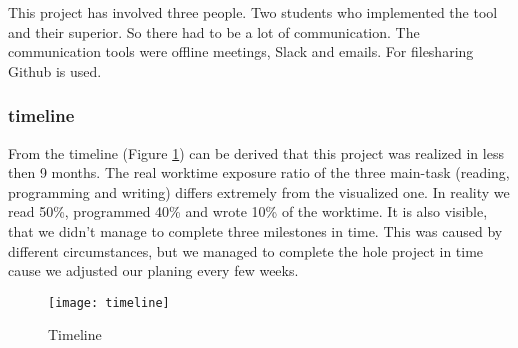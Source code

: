This project has involved three people. Two students who implemented the tool and their superior. So there had to be a lot of communication. The communication tools were offline meetings, Slack and emails. For filesharing Github is used. 


\subsubsection*{timeline}
From the timeline (Figure \ref{fig:timeline}) can be derived that this project was realized in less then 9 months. The real worktime exposure ratio of the three main-task (reading, programming and writing) differs extremely from the visualized one. In reality we read 50\%, programmed 40\% and wrote 10\% of the worktime. 
It is also visible, that we didn't manage to complete three milestones in time. This was caused by different circumstances, but we managed to complete the hole project in time cause we adjusted our planing every few weeks. 

\begin{figure}[!htb]
	\centering
		\texttt{[image: timeline]}
	\caption{Timeline}
	\label{fig:timeline}
\end{figure}


